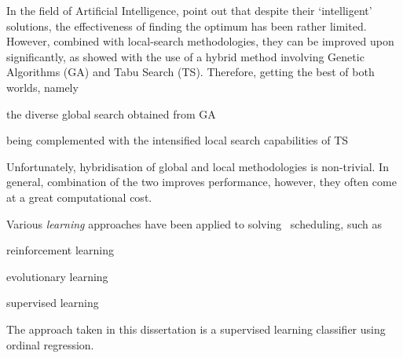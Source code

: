 

In the field of Artificial Intelligence, \cite{Meeran12} point out that despite 
their `intelligent' solutions, the effectiveness of finding the optimum has 
been rather limited. However, combined with local-search methodologies, they 
can be improved upon significantly, as \citeauthor{Meeran12} showed with the 
use of a hybrid method involving Genetic Algorithms (GA) and Tabu Search (TS). 
Therefore, getting the best of both worlds, namely
\begin{enumerate*}[label={{}}]
  \item the diverse global search obtained from GA 
  \item being complemented with the intensified local search capabilities of TS
\end{enumerate*}
Unfortunately, hybridisation of global and local methodologies is non-trivial. 
In general, combination of the two improves performance, however, they often 
come at a great computational cost.  

Various \emph{learning} approaches have been applied to solving \jsp\ 
scheduling, such as
\begin{enumerate*}
  \item reinforcement learning \citep{Zhang95}
  \item evolutionary learning \citep{Tay08}
  \item supervised learning \citep{Siggi05,Malik08}
\end{enumerate*}
The approach taken in this 
dissertation is a supervised learning classifier using ordinal regression. 


